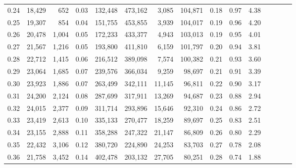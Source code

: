\begin{tabular}{rrrcrrrrrrrrrrr}
0.24 &  18,429 &    652 &                                       0.03 &  132,448 &  473,162 &    3,085 &  104,871 &  0.18 &  0.97 &                         4.38 \\
0.25 &  19,307 &    854 &                                       0.04 &  151,755 &  453,855 &    3,939 &  104,017 &  0.19 &  0.96 &                         4.20 \\
0.26 &  20,478 &  1,004 &                                       0.05 &  172,233 &  433,377 &    4,943 &  103,013 &  0.19 &  0.95 &                         4.01 \\
0.27 &  21,567 &  1,216 &                                       0.05 &  193,800 &  411,810 &    6,159 &  101,797 &  0.20 &  0.94 &                         3.81 \\
0.28 &  22,712 &  1,415 &                                       0.06 &  216,512 &  389,098 &    7,574 &  100,382 &  0.21 &  0.93 &                         3.60 \\
0.29 &  23,064 &  1,685 &                                       0.07 &  239,576 &  366,034 &    9,259 &   98,697 &  0.21 &  0.91 &                         3.39 \\
0.30 &  23,923 &  1,886 &                                       0.07 &  263,499 &  342,111 &   11,145 &   96,811 &  0.22 &  0.90 &                         3.17 \\
0.31 &  24,200 &  2,124 &                                       0.08 &  287,699 &  317,911 &   13,269 &   94,687 &  0.23 &  0.88 &                         2.94 \\
0.32 &  24,015 &  2,377 &                                       0.09 &  311,714 &  293,896 &   15,646 &   92,310 &  0.24 &  0.86 &                         2.72 \\
0.33 &  23,419 &  2,613 &                                       0.10 &  335,133 &  270,477 &   18,259 &   89,697 &  0.25 &  0.83 &                         2.51 \\
0.34 &  23,155 &  2,888 &                                       0.11 &  358,288 &  247,322 &   21,147 &   86,809 &  0.26 &  0.80 &                         2.29 \\
0.35 &  22,432 &  3,106 &                                       0.12 &  380,720 &  224,890 &   24,253 &   83,703 &  0.27 &  0.78 &                         2.08 \\
0.36 &  21,758 &  3,452 &                                       0.14 &  402,478 &  203,132 &   27,705 &   80,251 &  0.28 &  0.74 &                         1.88 \\

\end{tabular}
